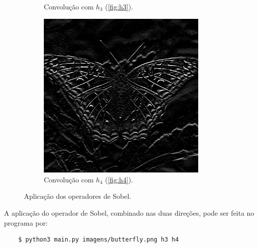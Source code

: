 \begin{figure}[H]
\begin{subfigure}{0.48\textwidth}
        \caption{Convolução com $h_3$ (\ref{fig:h3}).}
        \label{fig:sobel:x}
    \end{subfigure}%
    \begin{subfigure}{0.48\textwidth}
        \centering
        \includegraphics[width=0.9\textwidth]{resultados/butterfly_h4.png}
        \caption{Convolução com $h_4$ (\ref{fig:h4}).}
        \label{fig:sobel:y}
    \end{subfigure}

    \caption{Aplicação dos operadores de Sobel.}
    \label{fig:sobel}
\end{figure}

A aplicação do operador de Sobel, combinado nas duas direções, pode ser feita no programa por:

\begin{verbatim}
    $ python3 main.py imagens/butterfly.png h3 h4
\end{verbatim}

